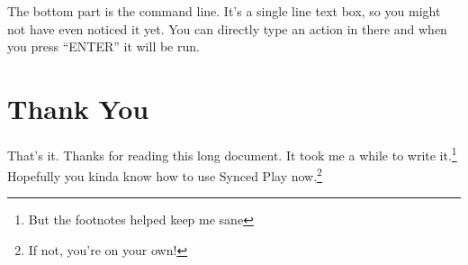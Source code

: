 \documentclass{article}
\begin{document}
The bottom part is the command line. It's a single line text box, so you
might not have even noticed it yet. You can directly type an action in
there and when you press ``ENTER'' it will be run.

\newpage

\section*{Thank You}

That's it. Thanks for reading this long document. It took me a while to 
write it.\footnote{But the footnotes helped keep me sane} Hopefully you
kinda know how to use Synced Play now.\footnote{If not, you're on your
own!}
\end{document}
